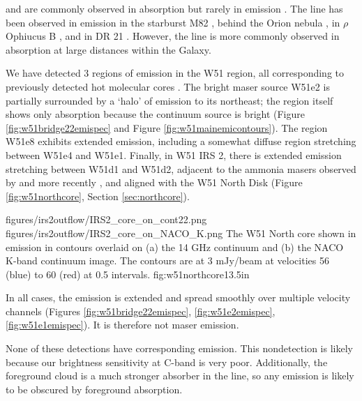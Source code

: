 \formaldehyde \oneone and \twotwo are commonly observed in absorption
but rarely in emission \citep[e.g.][]{Mangum1993a,Araya2007b}.  The \twotwo
line has been observed in emission in the starburst M82 \citep{Mangum2008a},
behind the Orion nebula
\citep{Evans1975a,Kutner1976a,Batrla1983a,Johnston1983a,Bastien1985a,Wilson1989a},
in $\rho$ Ophiucus B
\citep{Loren1980a,Loren1983a,Martin-Pintado1983a,Wadiak1985a}, and in DR 21
\citep{Wilson1982a,Johnston1984a}.  However, the \twotwo line is more commonly
observed in absorption at large distances within the Galaxy.

We have detected 3 regions of \twotwo emission in the W51 region, all
corresponding to previously detected hot molecular cores
\citep{Zhang1997a,Shi2010a,Shi2010b,Goddi2015a}.  The bright
maser source W51e2 is partially surrounded by a `halo' of \formaldehyde \twotwo
emission to its northeast; the \hchii region itself shows only \twotwo
absorption because the continuum source is bright
(Figure \ref{fig:w51bridge22emispec} and Figure \ref{fig:w51mainemicontours}).
The \hchii region W51e8 exhibits extended \twotwo emission, including a
somewhat diffuse region stretching between W51e4 and W51e1.  Finally, in W51
IRS 2, there is extended \twotwo
emission stretching between W51d1 and W51d2, adjacent to the ammonia masers
observed by \citet{Zhang1995a} and more recently \citet{Goddi2015a}, and
aligned with the \citet{Zapata2010a} W51 North Disk (Figure
\ref{fig:w51northcore}, Section \ref{sec:northcore}).

\FigureTwo
{figures/irs2outflow/IRS2_core_on_cont22.png}
{figures/irs2outflow/IRS2_core_on_NACO_K.png}
{The W51 North core shown in \formaldehyde \twotwo emission in contours
overlaid on (a) the 14 GHz continuum and (b) the NACO K-band continuum image.
The contours are at 3 mJy/beam at velocities 56 (blue) to 60 (red) \kms at 0.5
\kms intervals.
}
{fig:w51northcore}{1}{3.5in}

In all cases, the emission is extended and spread smoothly over multiple
velocity channels (Figures 
\ref{fig:w51bridge22emispec}, \ref{fig:w51e2emispec}, \ref{fig:w51e1emispec}).
It is therefore not maser emission.

None of these detections have corresponding \oneone emission.  This
nondetection is likely because our brightness sensitivity at C-band is very
poor.    Additionally,
the foreground cloud is a much stronger absorber in the \oneone line, so any
emission is likely to be obscured by foreground absorption.

